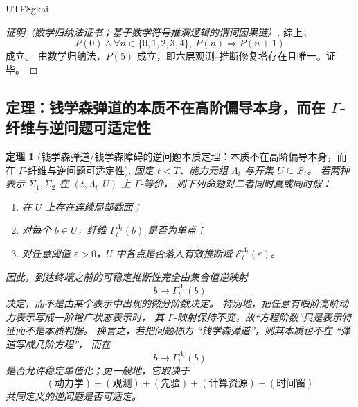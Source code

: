 \documentclass[12pt]{article}
\newtheorem{theorem}{定理}[section]
\begin{document}
\begin{CJK*}{UTF8}{gkai}
\begin{proof}[证明（数学归纳法证书；基于数学符号推演逻辑的谓词因果链）]
综上，
\[
  P(0)
  \wedge
  \forall n\in\{0,1,2,3,4\},\ P(n)\Rightarrow P(n+1)
\]
成立。
由数学归纳法，$P(5)$ 成立，即六层观测--推断修复塔存在且唯一。证毕。
\end{proof}

\subsection{定理：钱学森弹道的本质不在高阶偏导本身，而在 \texorpdfstring{$\Gamma$}{Gamma}-纤维与逆问题可适定性}
\label{subsec:tex1-ch1-theorem}

\begin{theorem}[钱学森弹道/钱学森障碍的逆问题本质定理：本质不在高阶偏导本身，而在 \texorpdfstring{$\Gamma$}{Gamma}-纤维与逆问题可适定性]
\label{thm:tex1-gamma-invariant}
固定 $t<T$、能力元组 $\Lambda_t$ 与开集 $U\subseteq \mathcal B_t$。
若两种表示 $\Sigma_1,\Sigma_2$ 在 $(t,\Lambda_t,U)$ 上 \(\Gamma\)-等价，
则下列命题对二者同时真或同时假：
\begin{enumerate}
  \item 在 $U$ 上存在连续局部截面；
  \item 对每个 $b\in U$，纤维 $\Gamma_t^{\Lambda_t}(b)$ 是否为单点；
  \item 对任意阈值 $\varepsilon>0$，$U$ 中各点是否落入有效推断域 $\mathcal E_t^{\Lambda_t}(\varepsilon)$。
\end{enumerate}
因此，到达终端之前的可稳定推断性完全由集合值逆映射
\[
  b\longmapsto \Gamma_t^{\Lambda_t}(b)
\]
决定，而不是由某个表示中出现的微分阶数决定。
特别地，把任意有限阶高阶动力表示写成一阶增广状态表示时，
其 \(\Gamma\)-映射保持不变，故“方程阶数”只是表示特征而不是本质判据。
换言之，若把问题称为 ``钱学森弹道''，则其本质也不在 ``弹道写成几阶方程''，
而在
\[
  b\mapsto \Gamma_t^{\Lambda_t}(b)
\]
是否允许稳定单值化；更一般地，它取决于
\[
  (\text{动力学})+(\text{观测})+(\text{先验})+(\text{计算资源})+(\text{时间窗})
\]
共同定义的逆问题是否可适定。
\end{theorem}


\end{CJK*}
\end{document}
